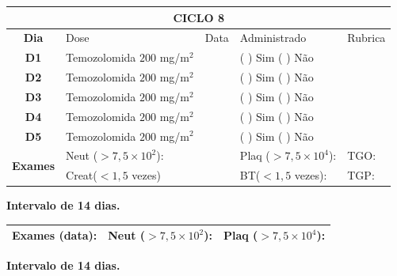 \documentclass[11pt,a4paper,oldfontcommands]{memoir}
\begin{document}
\begin{center}
\begin{longtable}{p{1cm}p{4cm}|p{1cm}|p{4.6cm}|p{3cm}}
	\hline
	\multicolumn{5}{c}{\textbf{CICLO 8}}\\
\hline
    \multicolumn{1}{c|}{\multirow{1}{*}{\textbf{Dia}}}&{Dose}&{Data}&{Administrado}&{Rubrica} \\
    \hline
    \multicolumn{1}{c|}{\multirow{1}{*}{\textbf{D1}}}&{Temozolomida \(200\) mg/m\(^2\)}&&{(  ) Sim (  ) Não}&\\
    \multicolumn{1}{c|}{\multirow{1}{*}{\textbf{D2}}}&{Temozolomida \(200\) mg/m\(^2\)}&&{(  ) Sim (  ) Não}&\\
    \multicolumn{1}{c|}{\multirow{1}{*}{\textbf{D3}}}&{Temozolomida \(200\) mg/m\(^2\)}&&{(  ) Sim (  ) Não}&\\
    \multicolumn{1}{c|}{\multirow{1}{*}{\textbf{D4}}}&{Temozolomida \(200\) mg/m\(^2\)}&&{(  ) Sim (  ) Não}&\\
    \multicolumn{1}{c|}{\multirow{1}{*}{\textbf{D5}}}&{Temozolomida \(200\) mg/m\(^2\)}&&{(  ) Sim (  ) Não}&\\
    \hline
    \multicolumn{1}{c|}{\multirow{2}{*}{\textbf{Exames}}}&\multicolumn{2}{l|}{Neut (\(>7,5\times10^2\)):}&{Plaq (\(>7,5\times10^4\)):}&{TGO:}\\
    \cline{2-5}
    \multicolumn{1}{c|}{\multirow{2}{*}{{}}}&\multicolumn{2}{l|}{Creat(\(<1,5\) vezes)}&{BT(\(<1,5\) vezes):}&{TGP:}
    \\
    \hline
\end{longtable}
\textbf{Intervalo de 14 dias.}
\begin{longtable}{p{5cm}|p{5cm}|p{4.5cm}}
    \hline
    \textbf{Exames (data):}&{Neut (\(>7,5\times10^2\)):}&{Plaq (\(>7,5\times10^4\)):}
    \\
    \hline
\end{longtable}
\textbf{Intervalo de 14 dias.}
\end{center}
\clearpage
\end{document}
